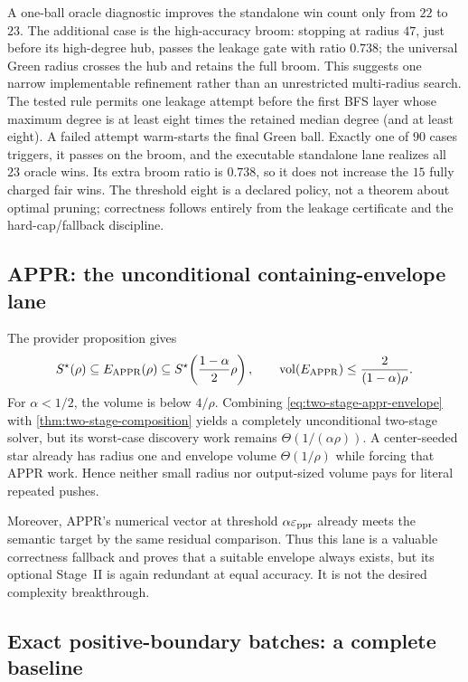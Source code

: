 A one-ball oracle diagnostic improves the standalone win count only from
$22$ to $23$.
The additional case is the high-accuracy broom: stopping at radius $47$, just
before its high-degree hub, passes the leakage gate with ratio $0.738$;
the universal Green radius crosses the hub and retains the full broom.  This
suggests one narrow implementable refinement rather than an unrestricted
multi-radius search.  The tested rule permits one leakage attempt before the
first BFS layer whose maximum degree is at least eight times the retained
median degree (and at least eight).  A failed attempt warm-starts the final
Green ball.  Exactly one of $90$ cases triggers, it passes on the broom, and
the executable standalone lane realizes all $23$ oracle wins.  Its extra
broom ratio is $0.738$, so it does not increase the $15$ fully charged fair
wins.  The threshold eight is a
declared policy, not a theorem about optimal pruning; correctness follows
entirely from the leakage certificate and the hard-cap/fallback discipline.

\subsection{APPR: the unconditional containing-envelope lane}

The provider proposition
 gives
\begin{equation}
 S^\star(\rho)
 \subseteq E_{\rm APPR}(\rho)
 \subseteq S^\star\!\left(\frac{1-\alpha}{2}\rho\right),
 \qquad
 \operatorname{vol}(E_{\rm APPR})\leq\frac{2}{(1-\alpha)\rho}.
 \label{eq:two-stage-appr-envelope}
\end{equation}
For $\alpha<1/2$, the volume is below $4/\rho$.  Combining
\cref{eq:two-stage-appr-envelope} with
\cref{thm:two-stage-composition} yields a completely unconditional
two-stage solver, but its worst-case discovery work remains
$\Theta(1/(\alpha\rho))$.  A center-seeded star already has radius one and
envelope volume $\Theta(1/\rho)$ while forcing that APPR work.  Hence neither
small radius nor output-sized volume pays for literal repeated pushes.

Moreover, APPR's numerical vector at threshold $\alpha\varepsilon_{\mathrm{ppr}}$ already meets
the semantic target by the same residual comparison.  Thus this lane is a
valuable correctness fallback and proves that a suitable envelope always
exists, but its optional Stage~II is again redundant at equal accuracy.  It
is not the desired complexity breakthrough.

\subsection{Exact positive-boundary batches: a complete baseline}

